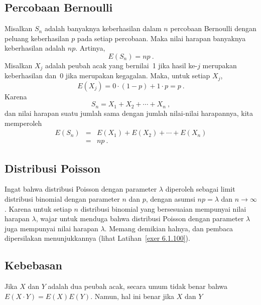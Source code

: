\subsection*{Percobaan Bernoulli}

\begin{theorem}\label{thm 6.3} Misalkan $S_n$ adalah banyaknya keberhasilan dalam
$n$ percobaan Bernoulli dengan peluang keberhasilan $p$ pada setiap percobaan. Maka
nilai harapan banyaknya keberhasilan adalah $np$. Artinya,
$$ E(S_n) = np\ .
$$
\proof Misalkan $X_j$ adalah peubah acak yang bernilai~1 jika hasil ke-$j$ merupakan
keberhasilan dan~0 jika merupakan kegagalan. Maka, untuk setiap $X_j$,
$$ E(X_j) = 0\cdot(1 - p) + 1\cdot p = p\ .
$$ Karena
$$ S_n = X_1 + X_2 +\cdots+ X_n\ ,
$$ dan nilai harapan suatu jumlah sama dengan jumlah nilai-nilai harapannya, kita
memperoleh
\begin{eqnarray*} E(S_n) & = & E(X_1) + E(X_2) +\cdots+ E(X_n) \\
       & = & np\ .
\end{eqnarray*}
\end{theorem}

\subsection*{Distribusi Poisson}

Ingat bahwa distribusi Poisson dengan parameter $\lambda$ diperoleh sebagai limit
distribusi binomial dengan parameter $n$ dan $p$, dengan asumsi $np = \lambda$ dan
$n \rightarrow \infty$. Karena untuk setiap $n$ distribusi binomial yang bersesuaian
mempunyai nilai harapan $\lambda$, wajar untuk menduga bahwa distribusi Poisson dengan
parameter $\lambda$ juga mempunyai nilai harapan $\lambda$. Memang demikian halnya,
dan pembaca dipersilakan menunjukkannya (lihat Latihan~\ref{exer 6.1.100}).

\subsection*{Kebebasan}

Jika $X$ dan $Y$ adalah dua peubah acak, secara umum tidak benar bahwa $E(X
\cdot Y) = E(X)E(Y)$. Namun, hal ini benar jika $X$ dan $Y$ 

